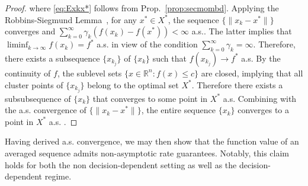 \documentclass[11pt,reqno]{amsart}
\newcommand{\1}{{\bf 1}}
\newcommand{\2}{{\bf 2}}
\numberwithin{equation}{section}
\theoremstyle{remark}
\begin{document}
{\begin{proof}
		where \eqref{eq:Exkx*} follows from Prop.~\ref{prop:secmombd}. Applying the Robbins-Siegmund Lemma~\cite{robbins1971convergence}, for any $x^* \in X^*$,  the sequence $\{\|x_k-x^*\|\}$ converges and 
		$\sum_{k=0}^\infty \gamma_k \left(f(x_k)-f(x^*)\right) < \infty$ a.s.. The latter implies that $ \liminf _{k \rightarrow \infty} f\left(x_{k}\right)=f^{*} $ a.s. in view of the condition $ \sum_{k=0}^{\infty} \gamma_{k}=\infty$. Therefore, there exists a subsequence $\{x_{k_j}\}$ of $\{x_k\}$ such that $f(x_{k_j}) \rightarrow f^*$ a.s. By the continuity of $f$, the sublevel sets $\{x \in \mathbb{R}^{n}: f(x) \leq c\}$ are closed, implying that all cluster points of $\{x_{k_j}\}$ belong to the optimal set $X^*$. Therefore there exists a subsubsequence of $\{x_k\}$ that converges to some point in $X^*$ a.s. Combining with the a.s. convergence of $\{\|x_k-x^*\|\}$, the entire sequence $\{x_k\}$ converges to a point in $X^*$ a.s. .
		\end{proof}
		
		\smallskip
		
		Having derived a.s. convergence, we may then show that the function value of an averaged sequence admits non-asymptotic rate guarantees. Notably, this claim holds for both the non decision-dependent setting as well as the decision-dependent regime.
		
		\medskip
		
}
\end{document}
